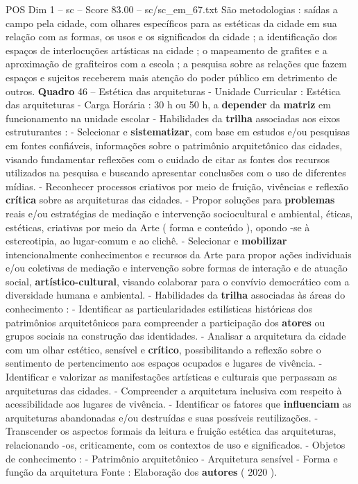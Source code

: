 \begin{textsample}{POS Dim 1 – sc – Score 83.00 – sc/sc\_em\_67.txt}
São metodologias : saídas a campo pela cidade, com olhares específicos para as estéticas da cidade em sua relação com as formas, os usos e os significados da cidade ; a identificação dos espaços de interlocuções artísticas na cidade ; o mapeamento de grafites e a aproximação de grafiteiros com a escola ; a pesquisa sobre as relações que fazem espaços e sujeitos receberem mais atenção do poder público em detrimento de outros. \textbf{Quadro} 46 – Estética das arquiteturas - Unidade Curricular : Estética das arquiteturas - Carga Horária : 30 h ou 50 h, a \textbf{depender} da \textbf{matriz} em funcionamento na unidade escolar - Habilidades da \textbf{trilha} associadas aos eixos estruturantes : - Selecionar e \textbf{sistematizar}, com base em estudos e/ou pesquisas em fontes confiáveis, informações sobre o patrimônio arquitetônico das cidades, visando fundamentar reflexões com o cuidado de citar as fontes dos recursos utilizados na pesquisa e buscando apresentar conclusões com o uso de diferentes mídias. - Reconhecer processos criativos por meio de fruição, vivências e reflexão \textbf{crítica} sobre as arquiteturas das cidades. - Propor soluções para \textbf{problemas} reais e/ou estratégias de mediação e intervenção sociocultural e ambiental, éticas, estéticas, criativas por meio da Arte ( forma e conteúdo ), opondo -se à estereotipia, ao lugar-comum e ao clichê. - Selecionar e \textbf{mobilizar} intencionalmente conhecimentos e recursos da Arte para propor ações individuais e/ou coletivas de mediação e intervenção sobre formas de interação e de atuação social, \textbf{artístico-cultural}, visando colaborar para o convívio democrático com a diversidade humana e ambiental. - Habilidades da \textbf{trilha} associadas às áreas do conhecimento : - Identificar as particularidades estilísticas históricas dos patrimônios arquitetônicos para compreender a participação dos \textbf{atores} ou grupos sociais na construção das identidades. - Analisar a arquitetura da cidade com um olhar estético, sensível e \textbf{crítico}, possibilitando a reflexão sobre o sentimento de pertencimento aos espaços ocupados e lugares de vivência. - Identificar e valorizar as manifestações artísticas e culturais que perpassam as arquiteturas das cidades. - Compreender a arquitetura inclusiva com respeito à acessibilidade aos lugares de vivência. - Identificar os fatores que \textbf{influenciam} as arquiteturas abandonadas e/ou destruídas e suas possíveis reutilizações. - Transcender os aspectos formais da leitura e fruição estética das arquiteturas, relacionando -os, criticamente, com os contextos de uso e significados. - Objetos de conhecimento : - Patrimônio arquitetônico - Arquitetura sensível - Forma e função da arquitetura Fonte : Elaboração dos \textbf{autores} ( 2020 ).

\end{textsample}
